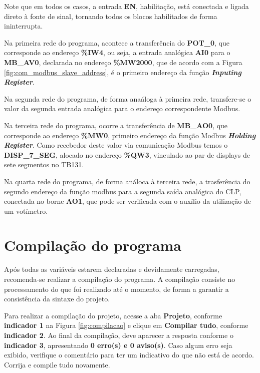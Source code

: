 Note que em todos os casos, 
a entrada \textbf{EN}, habilitação, 
está conectada e ligada direto à fonte de sinal, 
tornando todos os blocos habilitados de forma ininterrupta. 


Na primeira rede do programa, 
acontece a transferência do \textbf{POT\_0}, 
que corresponde ao endereço \textbf{\%IW4}, 
ou seja, a entrada analógica \textbf{AI0} para o \textbf{MB\_AV0},
declarada no endereço \textbf{\%MW2000}, 
que de acordo com a Figura \ref{fig:com_modbus_slave_address}, 
é o primeiro endereço da função \textbf{\textit{Inputing Register}}.

Na segunda rede do programa, 
de forma anaáloga à primeira rede, 
transfere-se o valor da segunda entrada analógica para o endereço correspondente Modbus.

Na terceira rede do programa, 
ocorre a transferência de \textbf{MB\_AO0}, 
que corresponde ao endereço \textbf{\%MW0}, 
primeiro endereço da função Modbus 
\textbf{\textit{Holding Register}}. 
Como recebedor deste valor via comunicação Modbus temos o 
\textbf{DISP\_7\_SEG}, alocado no endereço \textbf{\%QW3}, 
vinculado ao par de displays de sete segmentos no TB131. 

Na quarta rede do programa, 
de forma análoca à terceira rede, 
a trasferência do segundo endereço da função modbus para a segunda saída analógica do CLP, 
conectada no borne \textbf{AO1}, que pode ser verificada com o auxílio da utilização de um votímetro. 




\section{Compilação do programa}

Após todas as variáveis estarem declaradas e devidamente carregadas, 
recomenda-se realizar a compilação do programa. 
A compilação consiste no processamento do que foi realizado até o momento, 
de forma a garantir a consistência da sintaxe do projeto. 

Para realizar a compilação do projeto, 
acesse a aba \textbf{Projeto}, 
conforme \textbf{indicador 1} na Figura \ref{fig:compilacao} 
e clique em \textbf{Compilar tudo}, conforme \textbf{indicador 2}. 
Ao final da compilação, deve aparecer a resposta conforme o \textbf{indicador 3}, apresentando \textbf{0 erro(s) e 0 aviso(s)}. 
Caso algum erro seja exibido, verifique o comentário para ter um indicativo do que não está de acordo. 
Corrija e compile tudo novamente. 



